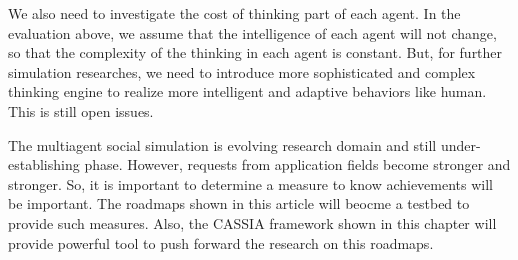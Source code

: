 We also need to investigate the cost of thinking part of each agent.
In the evaluation above, we assume that the intelligence of each
agent will not change, so that the complexity of the thinking
in each agent is constant.
But, for further simulation researches, we need to introduce
more sophisticated and complex thinking engine to
realize more intelligent and adaptive behaviors like human.
This is still open issues. 

The multiagent social simulation
is evolving research domain and still under-establishing phase.
However, requests from application fields become stronger and
stronger.
So, it is important to determine a measure to know achievements will
be important.  
The roadmaps shown in this article will beocme a testbed to provide
such measures.
Also, the CASSIA framework shown in this chapter
will provide powerful tool to push forward the research on this
roadmaps.


